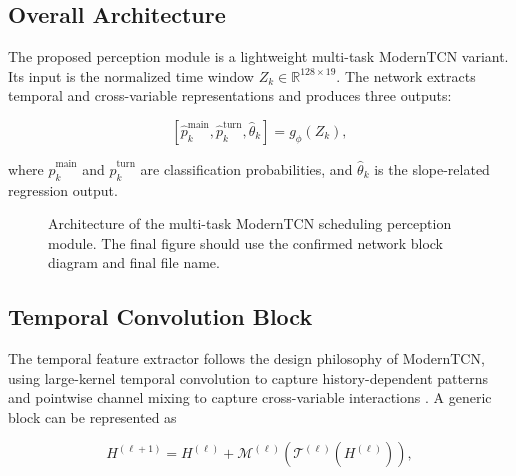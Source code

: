\documentclass[twocolumn]{article}
\begin{document}
\label{sec:moderntcn}

\subsection{Overall Architecture}

The proposed perception module is a lightweight multi-task ModernTCN variant. Its input is the normalized time window $Z_k\in\mathbb{R}^{128\times 19}$. The network extracts temporal and cross-variable representations and produces three outputs:

\begin{equation}
\left[
\hat{p}^{\mathrm{main}}_k,
\hat{p}^{\mathrm{turn}}_k,
\hat{\theta}_k
\right]
=
g_{\phi}(Z_k),
\label{eq:multi_task_model}
\end{equation}

where $\hat{p}^{\mathrm{main}}_k$ and $\hat{p}^{\mathrm{turn}}_k$ are classification probabilities, and $\hat{\theta}_k$ is the slope-related regression output.

\begin{figure}[!t]

\centering


\caption{Architecture of the multi-task ModernTCN scheduling perception module. The final figure should use the confirmed network block diagram and final file name.}

\label{fig:moderntcn_architecture}

\end{figure}

\subsection{Temporal Convolution Block}

The temporal feature extractor follows the design philosophy of ModernTCN, using large-kernel temporal convolution to capture history-dependent patterns and pointwise channel mixing to capture cross-variable interactions \cite{Luo2024ModernTCN}. A generic block can be represented as

\begin{equation}
H^{(\ell+1)} =
H^{(\ell)} +
\mathcal{M}^{(\ell)}
\left(
\mathcal{T}^{(\ell)}(H^{(\ell)})
\right),
\label{eq:modern_block}
\end{equation}
\end{document}
